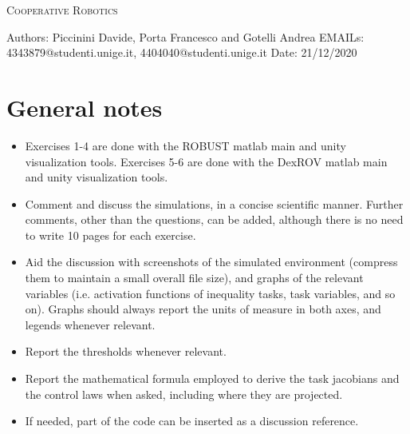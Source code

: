 \documentclass{article}
\makeatletter
\newcommand\frontmatter{%
    \cleardoublepage
  \pagenumbering{roman}}
\newcommand\mainmatter{%
    \cleardoublepage
  \pagenumbering{arabic}}
\makeatother
\begin{document}
\frontmatter
\onecolumn
\vskip 1cm
\begin{center}
\huge \textsc{Cooperative Robotics}\\
\vskip 1cm

\skip 0.5cm

\vskip 5cm

\normalsize
Authors: Piccinini Davide, Porta Francesco and Gotelli Andrea
EMAILs: 4343879@studenti.unige.it, 4404040@studenti.unige.it
Date: 21/12/2020
\end{center}
\clearpage
\mainmatter
\section*{General notes}

\begin{itemize}
	\item Exercises 1-4 are done with the ROBUST matlab main and unity visualization tools. Exercises 5-6 are done with the DexROV matlab main and unity visualization tools.
	\item Comment and discuss the simulations, in a concise scientific manner. Further comments, other than the questions, can be added, although there is no need to write 10 pages for each exercise.
	\item Aid the discussion with screenshots of the simulated environment (compress them to maintain a small overall file size), and graphs of the relevant variables (i.e. activation functions of inequality tasks, task variables, and so on). Graphs should always report the units of measure in both axes, and legends whenever relevant.
	\item Report the thresholds whenever relevant.
	\item Report the mathematical formula employed to derive the task jacobians and the control laws when asked, including where they are projected.
	\item If needed, part of the code can be inserted as a discussion reference.
\end{itemize}
\end{document}
